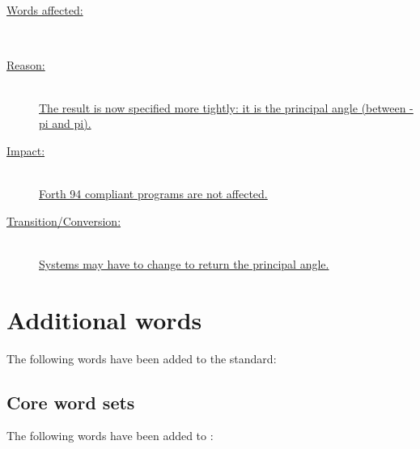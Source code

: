 \subsection[FATAN2]{\uline{}}
\label{diff:12:fatan2}

\begin{description}
\item[\uline{Words affected:}] ~\\
	\uline{}

\item[\uline{Reason:}] ~\\
	\uline{The result is now specified more tightly: it is the principal angle
	(between -pi and pi).}

\item[\uline{Impact:}] ~\\
	\uline{Forth 94 compliant programs are not affected.}

\item[\uline{Transition/Conversion:}] ~\\
	\uline{Systems may have to change  to return
	the principal angle.}
\end{description}
\cbend


\section{Additional words}
\label{diff:new12}

The following words have been added to the standard:

\setcounter{subsection}{5}
\subsection{Core word sets}
The following words have been added to :

\begin{minipage}[t]{0.3\linewidth}
	 \\
	 \\
\end{minipage}
\hfill
\begin{minipage}[t]{0.3\linewidth}
	 \\
	 \\
\end{minipage}
\hfill
\begin{minipage}[t]{0.3\linewidth}
	 \\
	 \\
\end{minipage}


